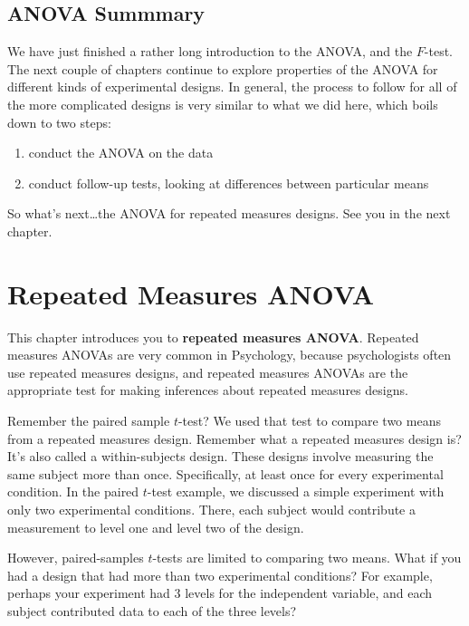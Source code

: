 \documentclass[]{book}
\providecommand{\tightlist}{%
  \setlength{\itemsep}{0pt}\setlength{\parskip}{0pt}}
\begin{document}
\hypertarget{anova-summmary}{%
\section{ANOVA Summmary}\label{anova-summmary}}

We have just finished a rather long introduction to the ANOVA, and the \(F\)-test. The next couple of chapters continue to explore properties of the ANOVA for different kinds of experimental designs. In general, the process to follow for all of the more complicated designs is very similar to what we did here, which boils down to two steps:

\begin{enumerate}
\def\labelenumi{\arabic{enumi})}
\tightlist
\item
  conduct the ANOVA on the data
\item
  conduct follow-up tests, looking at differences between particular means
\end{enumerate}

So what's next\ldots{}the ANOVA for repeated measures designs. See you in the next chapter.

\hypertarget{repeated-measures-anova}{%
\chapter{Repeated Measures ANOVA}\label{repeated-measures-anova}}

This chapter introduces you to \textbf{repeated measures ANOVA}. Repeated measures ANOVAs are very common in Psychology, because psychologists often use repeated measures designs, and repeated measures ANOVAs are the appropriate test for making inferences about repeated measures designs.

Remember the paired sample \(t\)-test? We used that test to compare two means from a repeated measures design. Remember what a repeated measures design is? It's also called a within-subjects design. These designs involve measuring the same subject more than once. Specifically, at least once for every experimental condition. In the paired \(t\)-test example, we discussed a simple experiment with only two experimental conditions. There, each subject would contribute a measurement to level one and level two of the design.

However, paired-samples \(t\)-tests are limited to comparing two means. What if you had a design that had more than two experimental conditions? For example, perhaps your experiment had 3 levels for the independent variable, and each subject contributed data to each of the three levels?
\end{document}
